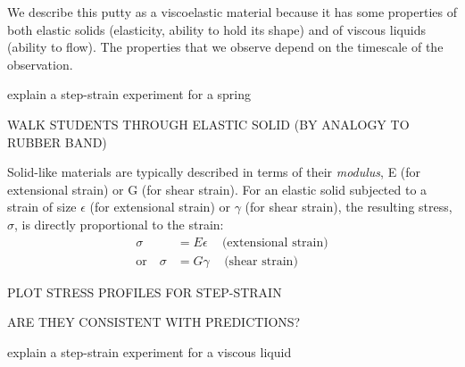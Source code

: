 \begin{activity}
\begin{ctqs}
\begin{solution}[1.5in]
				We describe this putty as a viscoelastic material because it  has some properties of both elastic solids (elasticity, ability to hold its shape) and of viscous liquids (ability to flow).  The properties that we observe depend on the timescale of the observation.
				
			\end{solution}
		
\end{ctqs}

\begin{model}

	explain a step-strain experiment for a spring
	
\end{model}

\begin{ctqs}
	\question WALK STUDENTS THROUGH ELASTIC SOLID (BY ANALOGY TO RUBBER BAND)
	
\end{ctqs}

\begin{infobox}

	Solid-like materials are typically described in terms of their \emph{modulus}, E (for extensional strain) or G (for shear strain).  For an elastic solid subjected to a strain of size $\epsilon$ (for extensional strain) or $\gamma$ (for shear strain), the resulting stress, $\sigma$, is directly proportional to the strain:
	\begin{align*}
		\sigma &= E\epsilon\,\,\,\,\,\,\,\text{(extensional strain)}\\
		\text{or}\,\,\,\,\,\,\sigma &= G\gamma\,\,\,\,\,\,\,\text{(shear strain)}
	\end{align*}
	
\end{infobox}

\begin{ctqs}
	\question PLOT STRESS PROFILES FOR STEP-STRAIN
	
	\question ARE THEY CONSISTENT WITH PREDICTIONS?
\end{ctqs}

\begin{model}

	explain a step-strain experiment for a viscous liquid
	
\end{model}

\begin{ctqs}
	

\end{ctqs}
\end{activity}
